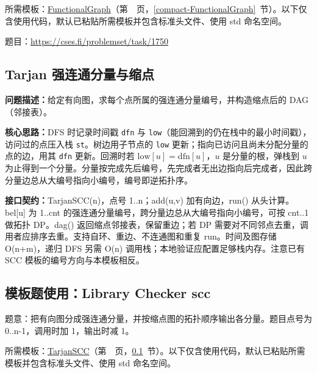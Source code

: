 所需模板：\hyperref[compact-FunctionalGraph]{FunctionalGraph}（第~\pageref{compact-FunctionalGraph}~页，\ref{compact-FunctionalGraph}~节）。以下仅含使用代码，默认已粘贴所需模板并包含标准头文件、使用 std 命名空间。

题目：\url{https://cses.fi/problemset/task/1750}



\subsection{Tarjan 强连通分量与缩点}\label{compact-TarjanSCC}

\noindent\textbf{问题描述：}\allowbreak 给定有向图，求每个点所属的强连通分量编号，并构造缩点后的 DAG（邻接表）。

\textbf{核心思路：}\allowbreak DFS 时记录时间戳 \texttt{dfn} 与 \texttt{low}（能回溯到的仍在栈中的最小时间戳），访问过的点压入栈 \texttt{st}。树边用子节点的 \texttt{low} 更新；指向已访问且尚未分配分量的点的边，用其 \texttt{dfn} 更新。回溯时若 $\mathrm{low}[u]=\mathrm{dfn}[u]$，$u$ 是分量的根，弹栈到 $u$ 为止得到一个分量。分量按完成先后编号，先完成者无出边指向后完成者，因此跨分量边总从大编号指向小编号，编号即逆拓扑序。



{\sloppy{}\noindent\textbf{接口契约：}TarjanSCC(n)，点号 1..n；add(u,v) 加有向边，run() 从头计算。bel[u] 为 1..cnt 的强连通分量编号，跨分量边总从大编号指向小编号，可按 cnt..1 做拓扑 DP。dag() 返回缩点邻接表，保留重边；若 DP 需要对不同邻点去重，调用者应排序去重。支持自环、重边、不连通图和重复 run。时间及图存储 O(n+m)，递归 DFS 另需 O(n) 调用栈；本地验证应配置足够栈内存。注意已有 SCC 模板的编号方向与本模板相反。\par}



\Needspace{422pt}

\subsection*{模板题使用：Library Checker scc}

\label{usage-example-2}

题意：把有向图分成强连通分量，并按缩点图的拓扑顺序输出各分量。题目点号为 0..n-1，调用时加 1，输出时减 1。

所需模板：\hyperref[compact-TarjanSCC]{TarjanSCC}（第~\pageref{compact-TarjanSCC}~页，\ref{compact-TarjanSCC}~节）。以下仅含使用代码，默认已粘贴所需模板并包含标准头文件、使用 std 命名空间。

